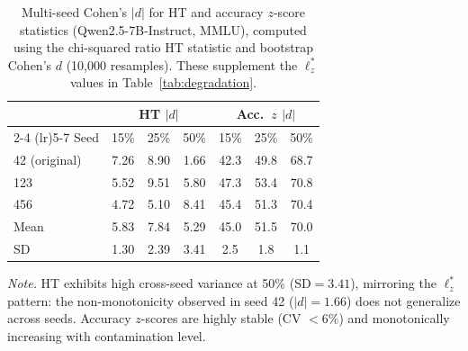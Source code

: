 \begin{table}[h]
\centering
\caption{Multi-seed Cohen's $|d|$ for HT and accuracy $z$-score statistics (Qwen2.5-7B-Instruct, MMLU), computed using the chi-squared ratio HT statistic and bootstrap Cohen's $d$ (10{,}000 resamples). These supplement the $\ell_z^*$ values in Table~\ref{tab:degradation}.}
\label{tab:ht_acc_multiseed}
\footnotesize
\begin{tabular}{@{}lcccccc@{}}
\toprule
& \multicolumn{3}{c}{HT $|d|$} & \multicolumn{3}{c}{Acc.\ $z$ $|d|$} \\
\cmidrule(lr){2-4} \cmidrule(lr){5-7}
Seed & 15\% & 25\% & 50\% & 15\% & 25\% & 50\% \\
\midrule
42 (original) & 7.26 & 8.90 & 1.66 & 42.3 & 49.8 & 68.7 \\
123 & 5.52 & 9.51 & 5.80 & 47.3 & 53.4 & 70.8 \\
456 & 4.72 & 5.10 & 8.41 & 45.4 & 51.3 & 70.4 \\
\addlinespace
Mean & 5.83 & 7.84 & 5.29 & 45.0 & 51.5 & 70.0 \\
SD & 1.30 & 2.39 & 3.41 & 2.5 & 1.8 & 1.1 \\
\bottomrule
\end{tabular}
\vspace{0.5em}

\noindent\textit{Note.} HT exhibits high cross-seed variance at 50\% (SD${=}3.41$), mirroring the $\ell_z^*$ pattern: the non-monotonicity observed in seed 42 ($|d|{=}1.66$) does not generalize across seeds. Accuracy $z$-scores are highly stable (CV $< 6\%$) and monotonically increasing with contamination level.
\end{table}

